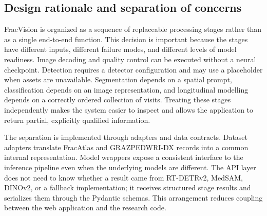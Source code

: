 \documentclass[12pt,a4paper]{article}
\begin{document}
\subsection{Design rationale and separation of concerns}
FracVision is organized as a sequence of replaceable processing stages rather than as a single end-to-end function. This decision is important because the stages have different inputs, different failure modes, and different levels of model readiness. Image decoding and quality control can be executed without a neural checkpoint. Detection requires a detector configuration and may use a placeholder when assets are unavailable. Segmentation depends on a spatial prompt, classification depends on an image representation, and longitudinal modelling depends on a correctly ordered collection of visits. Treating these stages independently makes the system easier to inspect and allows the application to return partial, explicitly qualified information.

The separation is implemented through adapters and data contracts. Dataset adapters translate FracAtlas and GRAZPEDWRI-DX records into a common internal representation. Model wrappers expose a consistent interface to the inference pipeline even when the underlying models are different. The API layer does not need to know whether a result came from RT-DETRv2, MedSAM, DINOv2, or a fallback implementation; it receives structured stage results and serializes them through the Pydantic schemas. This arrangement reduces coupling between the web application and the research code.
\end{document}
